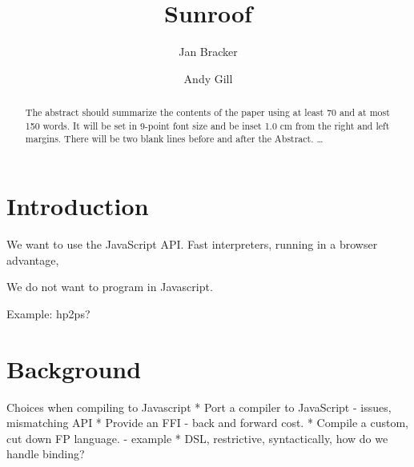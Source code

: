 \documentclass{llncs}
\begin{document}
%
\title{Sunroof}
%
%
\author{Jan Bracker \and Andy Gill}
%
%
%

\maketitle              %

\begin{abstract}
The abstract should summarize the contents of the paper
using at least 70 and at most 150 words. It will be set in 9-point
font size and be inset 1.0 cm from the right and left margins.
There will be two blank lines before and after the Abstract. \dots
{}
\end{abstract}
%
\section{Introduction}

We want to use the JavaScript API. Fast interpreters,
running in a browser advantage, 

We do not want to program in Javascript.

Example: hp2ps?

\section{Background}

Choices when compiling to Javascript
 * Port a compiler to JavaScript - issues, mismatching API
 * Provide an FFI - back and forward cost.
 * Compile a custom, cut down FP language. - example
 * DSL, restrictive, syntactically, how do we handle binding?
\end{document}
